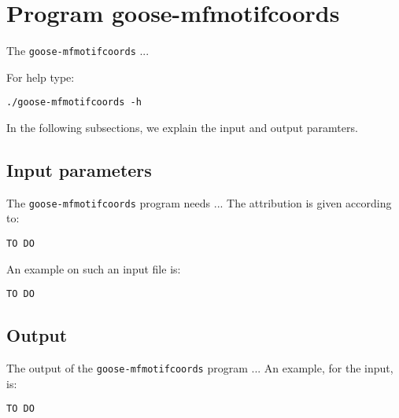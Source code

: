 \section{Program goose-mfmotifcoords}
The \texttt{goose-mfmotifcoords} ...

For help type:
\begin{lstlisting}
./goose-mfmotifcoords -h
\end{lstlisting}
In the following subsections, we explain the input and output paramters.

\subsection{Input parameters}

The \texttt{goose-mfmotifcoords} program needs ...
The attribution is given according to:
\begin{lstlisting}
TO DO
\end{lstlisting}

An example on such an input file is:
\begin{lstlisting}
TO DO
\end{lstlisting}

\subsection{Output}
The output of the \texttt{goose-mfmotifcoords} program ...
An example, for the input, is:
\begin{lstlisting}
TO DO
\end{lstlisting}
